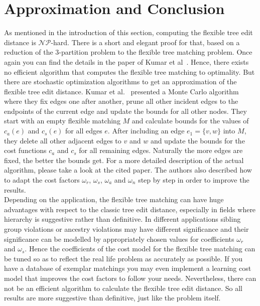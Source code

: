 \section{Approximation and Conclusion}
As mentioned in the introduction of this section, computing the flexible tree edit distance is $\mathcal{NP}$-hard. There is a short and elegant proof for that, based on a reduction of the 3-partition problem to the flexible tree matching problem. Once again you can find the details in the paper of Kumar et al~\cite{Kum}. Hence, there exists no efficient algorithm that computes the flexible tree matching to optimality. But there are stochastic optimization algorithms to get an approximation of the flexible tree edit distance. Kumar et al.~\cite{Kum} presented a Monte Carlo algorithm where they fix edges one after another, prune all other incident edges to the endpoints of the current edge and update the bounds for all other nodes. They start with an empty flexible matching $M$ and calculate bounds for the values of $c_a(e)$ and $c_s(e)$ for all edges $e$. After including an edge $e_1 = \{v,w\}$ into $M$, they delete all other adjacent edges to $v$ and $w$ and update the bounds for the cost functions $c_a$ and $c_s$ for all remaining edges. Naturally the more edges are fixed, the better the bounds get. For a more detailed description of the actual algorithm, please take a look at the cited paper. The authors also described how to adapt the cost factors $\omega_r$, $\omega_s$, $\omega_a$ and $\omega_n$ step by step in order to improve the results.\\
Depending on the application, the flexible tree matching can have huge advantages with respect to the classic tree edit distance, especially in fields where hierarchy is suggestive rather than definitive. In different applications sibling group violations or ancestry violations may have different significance and their significance can be modelled by appropriately chosen values for coefficients $\omega_r$ and $\omega_s$. Hence the coefficients of the cost model for the flexible tree matching can be tuned so as to reflect the real life problem as accurately as possible. If you have a database of exemplar matchings you may even implement a learning cost model that improves the cost factors to follow your needs.
Nevertheless, there can not be an efficient algorithm to calculate the flexible tree edit distance. So all results are more suggestive than definitive, just like the problem itself.